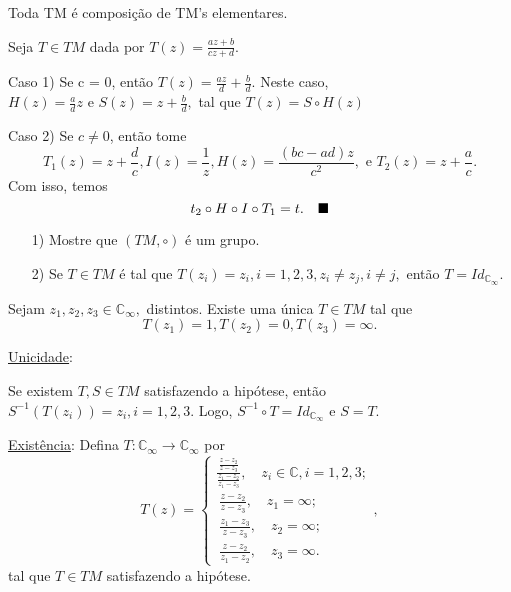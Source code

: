\documentclass[ComplexAnalysis/complex.tex]{subfiles}
\begin{document}
\begin{prop*}
	Toda TM é composição de TM's elementares.
\end{prop*}
\begin{proof*}
	Seja $T\in{TM}$ dada por $T(z) = \displaystyle\frac{az + b}{cz + d}.$

	Caso 1) Se c = 0, então $T(z) = \frac{az}{d} + \frac{b}{d}.$ Neste caso, $H(z) = \frac{a}{d}z \text{ e } S(z) = z + \frac{b}{d},$
	tal que $T(z) = S\circ{H(z)}$

	Caso 2) Se $c\neq0$, então tome
	$$
		T_1(z) = z + \frac{d}{c}, I(z) = \frac{1}{z}, H(z) = \frac{(bc - ad)z}{c^2}, \text{ e } T_2(z) = z + \frac{a}{c}.
	$$
	Com isso, temos
	$$
		t_2\circ{H}\circ{I}\circ{T_1} = t. \quad \text{$\blacksquare$}
	$$
\end{proof*}
\begin{exer*}
	\begin{itemize}
		\item[1)]Mostre que $(TM, \circ)$ é um grupo.
		\item[2)] Se $T\in{TM}$ é tal que $T(z_{i}) = z_{i}, i = 1, 2, 3, z_{i}\neq z_{j}, i\neq{j},$ então $T = Id_{\mathbb{C}_{\infty}}.$
	\end{itemize}
\end{exer*}
\begin{prop*}
	Sejam $z_1, z_2, z_3\in \mathbb{C}_{\infty}, $ distintos. Existe uma única $T\in{TM}$ tal que
	$$
		T(z_1) = 1, T(z_2) = 0, T(z_3) = \infty.
	$$
\end{prop*}
\begin{proof*}
	\underline{Unicidade}:

	Se existem $T, S\in{TM}$ satisfazendo a hipótese, então $S^{-1}(T(z_i)) = z_{i}, i=1, 2, 3$. Logo,
	$S^{-1}\circ{T} = Id_{\mathbb{C}_{\infty}} \text{ e } S = T.$

	\underline{Existência}: Defina $T:\mathbb{C}_{\infty}\rightarrow \mathbb{C}_{\infty}$ por
	$$
		T(z) = \left\{\begin{array}{ll}
			\displaystyle\frac{\frac{z-z_2}{z-z_3}}{\frac{z_1-z_2}{z_1-z_3}}, \quad z_{i}\in \mathbb{C}, i=1, 2, 3; \\\
			\displaystyle\frac{z-z_2}{z-z_3}, \quad z_1 = \infty;                                                   \\\
			\displaystyle\frac{z_1 - z_3}{z - z_3}, \quad z_2 = \infty;                                             \\\
			\displaystyle\frac{z - z_2}{z_1 - z_2}, \quad z_3 = \infty.
		\end{array}\right.,
	$$
	tal que $T\in{TM}$ satisfazendo a hipótese. \qedsymbol
\end{proof*}
\end{document}
